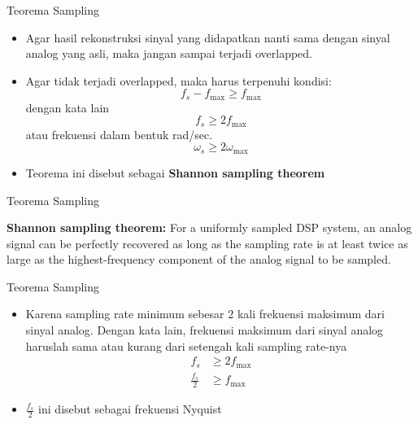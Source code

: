 \documentclass[pdflatex,compress,mathserif]{beamer}
\begin{document}
\begin{frame}{Teorema Sampling}
    \begin{itemize}
        \item Agar hasil rekonstruksi sinyal yang didapatkan nanti sama dengan sinyal analog yang asli, maka jangan sampai terjadi overlapped.
        \item Agar tidak terjadi overlapped, maka harus terpenuhi kondisi:
        \begin{equation}
            f_s - f_{\text{max}} \geq f_{\text{max}}
        \end{equation}
        dengan kata lain
        \begin{equation}
            f_s \geq 2f_{\text{max}}
            \label{eq:freq_nyquist}
        \end{equation}
        atau frekuensi dalam bentuk rad/sec.
        \begin{equation}
            \omega_s \geq 2\omega_{\text{max}}
        \end{equation}
        \item Teorema ini disebut sebagai \textbf{Shannon sampling theorem}
    \end{itemize} 
\end{frame}

\begin{frame}{Teorema Sampling}
    \begin{theorem}{\textbf{Shannon sampling theorem:}}
        For a uniformly sampled DSP system, an analog signal can be perfectly recovered as long as the sampling rate is at least twice as large as the highest-frequency component of the analog signal to be sampled.
    \end{theorem}
\end{frame}

\begin{frame}{Teorema Sampling}
    \begin{itemize}
        \item Karena sampling rate minimum sebesar 2 kali frekuensi maksimum dari sinyal analog. Dengan kata lain, frekuensi maksimum dari sinyal analog haruslah sama atau kurang dari setengah kali sampling rate-nya
        \begin{align*}
            f_s &\geq 2 f_\text{max} \\
            \frac{f_s}{2} &\geq f_\text{max}
        \end{align*}
        \item $\frac{f_s}{2}$ ini disebut sebagai frekuensi Nyquist
    \end{itemize}
\end{frame}
\end{document}
